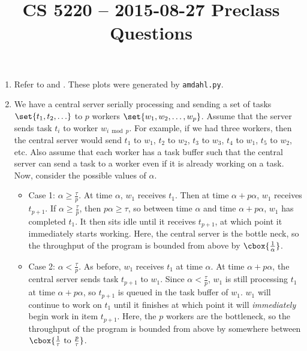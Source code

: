 \documentclass{hw}
\title{CS 5220 -- 2015-08-27 Preclass Questions}
\begin{document}
\maketitle{}

\begin{enumerate}
  \item
    Refer to  and . These plots were
    generated by \texttt{amdahl.py}.

  \item
    We have a central server serially processing and sending a set of tasks
    $\set{t_1, t_2, \ldots}$ to $p$ workers $\set{w_1, w_2, \ldots, w_p}$.
    Assume that the server sends task $t_i$ to worker $w_{i \bmod p}$. For
    example, if we had three workers, then the central server would send $t_1$
    to $w_1$, $t_2$ to $w_2$, $t_3$ to $w_3$, $t_4$ to $w_1$, $t_5$ to $w_2$,
    etc. Also assume that each worker has a task buffer such that the central
    server can send a task to a worker even if it is already working on a task.
    Now, consider the possible values of $\alpha$.

    \newcommand{\caseone}{\alpha \geq \frac{\tau}{p}}
    \newcommand{\casetwo}{\alpha < \frac{\tau}{p}}
    \begin{itemize}
      \item Case 1: $\caseone{}$. At time $\alpha$, $w_1$ receives $t_1$.
        Then at time $\alpha + p\alpha$, $w_1$ receives $t_{p + 1}$. If
        $\caseone{}$, then $p\alpha \geq \tau$, so between time $\alpha$ and
        time $\alpha + p\alpha$, $w_1$ has completed $t_1$. It then sits idle
        until it receives $t_{p + 1}$, at which point it immediately starts
        working. Here, the central server is the bottle neck, so the throughput
        of the program is bounded from above by $\cbox{\frac{1}{\alpha}}$.
      \item Case 2: $\casetwo{}$. As before, $w_1$ receives $t_1$ at time
        $\alpha$. At time $\alpha + p\alpha$, the central server sends task
        $t_{p + 1}$ to $w_1$. Since $\casetwo{}$, $w_1$ is still processing
        $t_1$ at time $\alpha + p\alpha$, so $t_{p + 1}$ is queued in the task
        buffer of $w_1$. $w_1$ will continue to work on $t_1$ until it finishes
        at which point it will \emph{immediately} begin work in item $t_{p +
        1}$. Here, the $p$ workers are the bottleneck, so the throughput of the
        program is bounded from above by somewhere between
        $\cbox{\frac{1}{\tau}~\text{to}~\frac{p}{\tau}}$.
    \end{itemize}


\end{enumerate}
\end{document}
